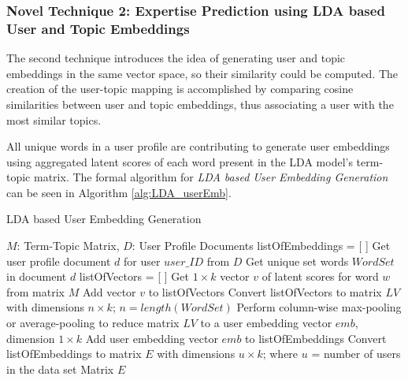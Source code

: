         \subsubsection{Novel Technique 2: Expertise Prediction using LDA based User and Topic Embeddings}
        
            The second technique introduces the idea of generating user and topic embeddings in the same vector space, so their similarity could be computed. The creation of the user-topic mapping is accomplished by comparing cosine similarities between user and topic embeddings, thus associating a user with the most similar topics. 
            
            All unique words in a user profile are contributing to generate user embeddings using aggregated latent scores of each word present in the LDA model's term-topic matrix. The formal algorithm for \emph{LDA based User Embedding Generation} can be seen in Algorithm \ref{alg:LDA_userEmb}. 
            
            \begin{algorithm}
                \caption{LDA based User Embedding Generation}
                \label{alg:LDA_userEmb}
                \begin{algorithmic}[1]
                    \REQUIRE $M$: Term-Topic Matrix, $D$: User Profile Documents 
                    \STATE listOfEmbeddings = [ ]
                        \STATE Get user profile document $d$ for user $user\_ID$ from $D$
                        \STATE Get unique set words $WordSet$ in document $d$
                        \STATE listOfVectors = [ ]
                        \STATE
                            \STATE Get $1 \times k$ vector $v$ of latent scores for word $w$ from matrix $M$
                            \STATE Add vector $v$ to listOfVectors
                        \ENDFOR
                        \STATE Convert listOfVectors to matrix $LV$ with dimensions $n \times k$; $n=length(WordSet)$
                        \STATE Perform column-wise max-pooling or average-pooling to reduce matrix $LV$ to a user embedding vector $emb$, dimension $1 \times k$
                        \STATE Add user embedding vector $emb$ to listOfEmbeddings
                    \ENDFOR
                    \STATE Convert listOfEmbeddings to matrix $E$ with dimensions $u \times k$; where $u$ = number of users in the data set
                    \RETURN Matrix $E$
                \end{algorithmic}
            \end{algorithm}
        
